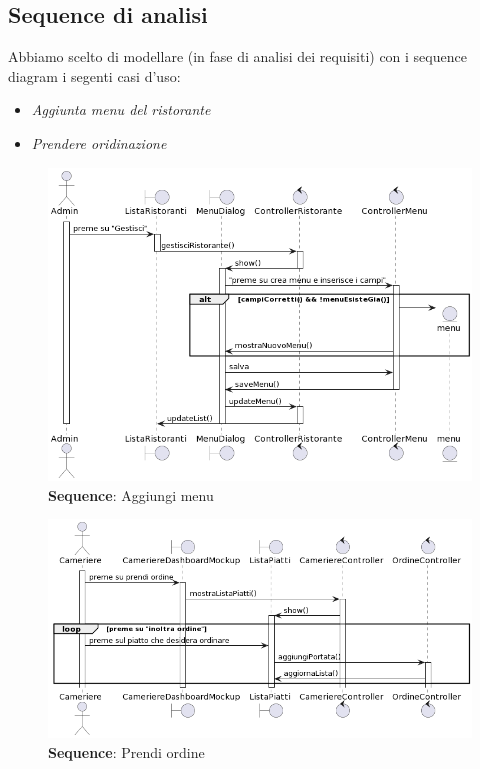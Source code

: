 \subsection{Sequence di analisi}

    \begin{flushleft}
        Abbiamo scelto di modellare (in fase di analisi dei requisiti) con i sequence diagram i segenti casi d'uso:
        \begin{itemize}
            \item  \emph{Aggiunta menu del ristorante}
            \item  \emph{Prendere oridinazione}
        \end{itemize}
    \end{flushleft}

    \begin{figure}[H]
        \centering
        \includegraphics[scale=0.6]{assets/diagrammi/Sequence di analisi/sequence_add_menu.png}
        \caption{\textbf{Sequence}: Aggiungi menu}\label{fig:seq_add_menu}
    \end{figure}

    
    \begin{figure}[H]
        \centering
        \includegraphics[scale=0.6]{assets/diagrammi/Sequence di analisi/sequence_take_order.png}
        \caption{\textbf{Sequence}: Prendi ordine}\label{fig:seq_take_order}
    \end{figure}
